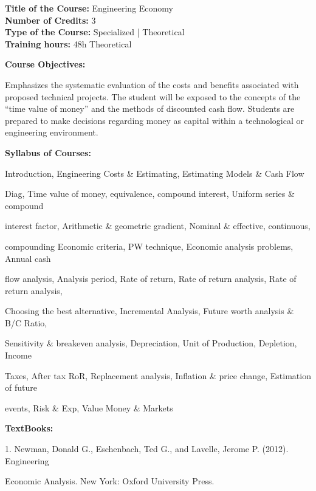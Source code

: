 \documentclass[12pt,a4paper]{article}
\begin{document}
\newpage
\textbf{Title of the Course:} Engineering Economy\\
\textbf{Number of Credits:} 3\\
\textbf{Type of the Course:} Specialized | Theoretical\\
\textbf{Training hours:} 48h Theoretical\par\vspace{4pt}
\textbf{Course Objectives:}\par\vspace{2pt}
Emphasizes the systematic evaluation of the costs and benefits associated
with proposed technical projects. The student will be exposed to the concepts of the “time
value of money” and the methods of discounted cash flow. Students are prepared to make
decisions regarding money as capital within a technological or engineering environment.\par\vspace{4pt}
\textbf{Syllabus of Courses:}\par\vspace{2pt}
Introduction, Engineering Costs \& Estimating, Estimating Models \& Cash Flow\par
Diag, Time value of money, equivalence, compound interest, Uniform series \& compound\par
interest factor, Arithmetic \& geometric gradient, Nominal \& effective, continuous,\par
compounding Economic criteria, PW technique, Economic analysis problems, Annual cash\par
flow analysis, Analysis period, Rate of return, Rate of return analysis, Rate of return analysis,\par
Choosing the best alternative, Incremental Analysis, Future worth analysis \& B/C Ratio,\par
Sensitivity \& breakeven analysis, Depreciation, Unit of Production, Depletion, Income\par
Taxes, After tax RoR, Replacement analysis, Inflation \& price change, Estimation of future\par
events, Risk \& Exp, Value Money \& Markets\par\vspace{4pt}
\textbf{TextBooks:}\par\vspace{2pt}
1. Newman, Donald G., Eschenbach, Ted G., and Lavelle, Jerome P. (2012). Engineering\par
Economic Analysis. New York: Oxford University Press.\par
\vspace{4pt}
\end{document}
